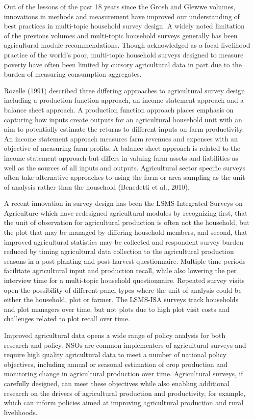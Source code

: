 \documentclass[
]{book}
\begin{document}
Out of the lessons of the past 18 years since the Grosh and Glewwe volumes, innovations in methods and measurement have improved our understanding of best practices in multi-topic household survey design. A widely noted limitation of the previous volumes and multi-topic household surveys generally has been agricultural module recommendations. Though acknowledged as a focal livelihood practice of the world's poor, multi-topic household surveys designed to measure poverty have often been limited by cursory agricultural data in part due to the burden of measuring consumption aggregates.

Rozelle (1991) described three differing approaches to agricultural survey design including a production function approach, an income statement approach and a balance sheet approach. A production function approach places emphasis on capturing how inputs create outputs for an agricultural household unit with an aim to potentially estimate the returns to different inputs on farm productivity. An income statement approach measures farm revenues and expenses with an objective of measuring farm profits. A balance sheet approach is related to the income statement approach but differs in valuing farm assets and liabilities as well as the sources of all inputs and outputs. Agricultural sector specific surveys often take alternative approaches to using the farm or area sampling as the unit of analysis rather than the household (Benedetti et al., 2010).

A recent innovation in survey design has been the LSMS-Integrated Surveys on Agriculture which have redesigned agricultural modules by recognizing first, that the unit of observation for agricultural production is often not the household, but the plot that may be managed by differing household members, and second, that improved agricultural statistics may be collected and respondent survey burden reduced by timing agricultural data collection to the agricultural production seasons in a post-planting and post-harvest questionnaire. Multiple time periods facilitate agricultural input and production recall, while also lowering the per interview time for a multi-topic household questionnaire. Repeated survey visits open the possibility of different panel types where the unit of analysis could be either the household, plot or farmer. The LSMS-ISA surveys track households and plot managers over time, but not plots due to high plot visit costs and challenges related to plot recall over time.

Improved agricultural data opens a wide range of policy analysis for both research and policy. NSOs are common implementers of agricultural surveys and require high quality agricultural data to meet a number of national policy objectives, including annual or seasonal estimation of crop production and monitoring change in agricultural production over time. Agricultural surveys, if carefully designed, can meet these objectives while also enabling additional research on the drivers of agricultural production and productivity, for example, which can inform policies aimed at improving agricultural production and rural livelihoods.
\end{document}
